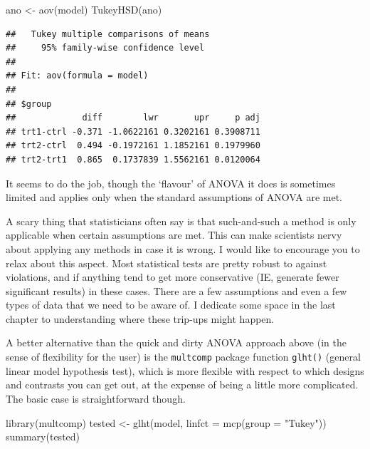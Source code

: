\documentclass[
]{book}
\newenvironment{Shaded}{\begin{snugshade}}{\end{snugshade}}
\newcommand{\AttributeTok}[1]{\textcolor[rgb]{0.77,0.63,0.00}{#1}}
\newcommand{\FunctionTok}[1]{\textcolor[rgb]{0.00,0.00,0.00}{#1}}
\newcommand{\NormalTok}[1]{#1}
\newcommand{\OtherTok}[1]{\textcolor[rgb]{0.56,0.35,0.01}{#1}}
\newcommand{\StringTok}[1]{\textcolor[rgb]{0.31,0.60,0.02}{#1}}
\newenvironment{sidenote}
{ \begin{tcolorbox}[colbacktitle=blue!50!white,
title=huh?,coltitle=white,
fonttitle=\bfseries] }
{  \end{tcolorbox} }
\begin{document}
\begin{Shaded}
\begin{Highlighting}[]
\NormalTok{ano }\OtherTok{\textless{}{-}} \FunctionTok{aov}\NormalTok{(model)}
\FunctionTok{TukeyHSD}\NormalTok{(ano)}
\end{Highlighting}
\end{Shaded}

\begin{verbatim}
##   Tukey multiple comparisons of means
##     95% family-wise confidence level
## 
## Fit: aov(formula = model)
## 
## $group
##             diff        lwr       upr     p adj
## trt1-ctrl -0.371 -1.0622161 0.3202161 0.3908711
## trt2-ctrl  0.494 -0.1972161 1.1852161 0.1979960
## trt2-trt1  0.865  0.1737839 1.5562161 0.0120064
\end{verbatim}

It seems to do the job, though the `flavour' of ANOVA it does is sometimes limited and applies only when the standard assumptions of ANOVA are met.

\begin{sidenote}
A scary thing that statisticians often say is that such-and-such a method is only applicable when certain assumptions are met. This can make scientists nervy about applying any methods in case it is wrong. I would like to encourage you to relax about this aspect. Most statistical tests are pretty robust to against violations, and if anything tend to get more conservative (IE, generate fewer significant results) in these cases. There are a few assumptions and even a few types of data that we need to be aware of. I dedicate some space in the last chapter to understanding where these trip-ups might happen.
\end{sidenote}

A better alternative than the quick and dirty ANOVA approach above (in the sense of flexibility for the user) is the \texttt{multcomp} package function \texttt{glht()} (general linear model hypothesis test), which is more flexible with respect to which designs and contrasts you can get out, at the expense of being a little more complicated. The basic case is straightforward though.

\begin{Shaded}
\begin{Highlighting}[]
\FunctionTok{library}\NormalTok{(multcomp)}
\NormalTok{tested }\OtherTok{\textless{}{-}} \FunctionTok{glht}\NormalTok{(model, }\AttributeTok{linfct =} \FunctionTok{mcp}\NormalTok{(}\AttributeTok{group =} \StringTok{"Tukey"}\NormalTok{))}
\FunctionTok{summary}\NormalTok{(tested)}
\end{Highlighting}
\end{Shaded}
\end{document}
